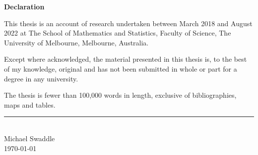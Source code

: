 
\thispagestyle{empty}

{
\color{offblack}\Large\bfseries Declaration}

\vspace{2em}

This thesis is an account of research undertaken between March 2018 and August 2022 at The School of Mathematics and Statistics, Faculty of Science, The University of Melbourne, Melbourne, Australia.

Except where acknowledged, the material presented in this thesis is, to the best of my knowledge, original and has not been submitted in whole or part for a degree in any university. 

The thesis is fewer than 100,000 words in length, exclusive of bibliographies, maps and tables.

\vfill

\begin{flushright}
\rule{14em}{0.6pt}\\
Michael Swaddle\\
\today
\end{flushright}
